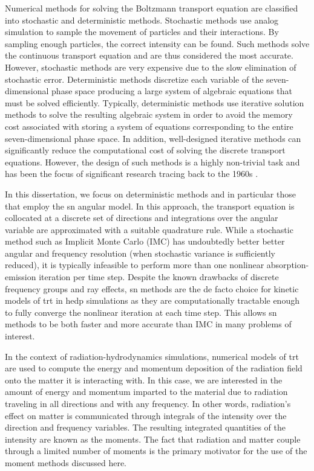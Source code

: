 \documentclass[../doc.tex]{subfiles}
\begin{document}
Numerical methods for solving the Boltzmann transport equation are classified into stochastic and deterministic methods. Stochastic methods use analog simulation to sample the movement of particles and their interactions. By sampling enough particles, the correct intensity can be found. Such methods solve the continuous transport equation and are thus considered the most accurate. However, stochastic methods are very expensive due to the slow elimination of stochastic error.
Deterministic methods discretize each variable of the seven-dimensional phase space producing a large system of algebraic equations that must be solved efficiently. Typically, deterministic methods use iterative solution methods to solve the resulting algebraic system in order to avoid the memory cost associated with storing a system of equations corresponding to the entire seven-dimensional phase space. In addition, well-designed iterative methods can significantly reduce the computational cost of solving the discrete transport equations. However, the design of such methods is a highly non-trivial task and has been the focus of significant research tracing back to the 1960s \cite{AL}. 

In this dissertation, we focus on deterministic methods and in particular those that employ the \gls{sn} angular model. In this approach, the transport equation is collocated at a discrete set of directions and integrations over the angular variable are approximated with a suitable quadrature rule. While a stochastic method such as Implicit Monte Carlo (IMC) \cite{2001JCoPh.172..543G} has undoubtedly better better angular and frequency resolution (when stochastic variance is sufficiently reduced), it is typically infeasible to perform more than one nonlinear absorption-emission iteration per time step. Despite the known drawbacks of discrete frequency groups and ray effects, \gls{sn} methods are the de facto choice for kinetic models of \gls{trt} in \gls{hedp} simulations as they are computationally tractable enough to fully converge the nonlinear iteration at each time step. This allows \gls{sn} methods to be both faster and more accurate than IMC in many problems of interest. 

In the context of radiation-hydrodynamics simulations, numerical models of \gls{trt} are used to compute the energy and momentum deposition of the radiation field onto the matter it is interacting with. In this case, we are interested in the amount of energy and momentum imparted to the material due to radiation traveling in all directions and with any frequency. In other words, radiation's effect on matter is communicated through integrals of the intensity over the direction and frequency variables. The resulting integrated quantities of the intensity are known as the moments. The fact that radiation and matter couple through a limited number of moments is the primary motivator for the use of the moment methods discussed here. 
\end{document}
